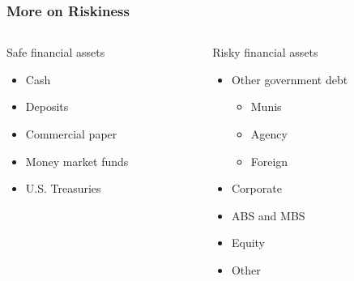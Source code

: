\documentclass[handout]{beamer}
\begin{document}
\begin{frame}
\frametitle{More on Riskiness}

\begin{columns}
\begin{column}{0.5\textwidth}

Safe financial assets

\begin{itemize}
\item Cash
\item Deposits
\item Commercial paper
\item Money market funds
\item U.S. Treasuries
\end{itemize}


\end{column}
\begin{column}{0.5\textwidth}

Risky financial assets

\begin{itemize}
\item Other government debt
\begin{itemize}
\item Munis
\item Agency
\item Foreign
\end{itemize}
\item Corporate
\item ABS and MBS
\item Equity
\item Other
\end{itemize}

\end{column}
\end{columns}

\bigskip

\hyperlink{duchinapproach}{}


\end{frame}
\end{document}
